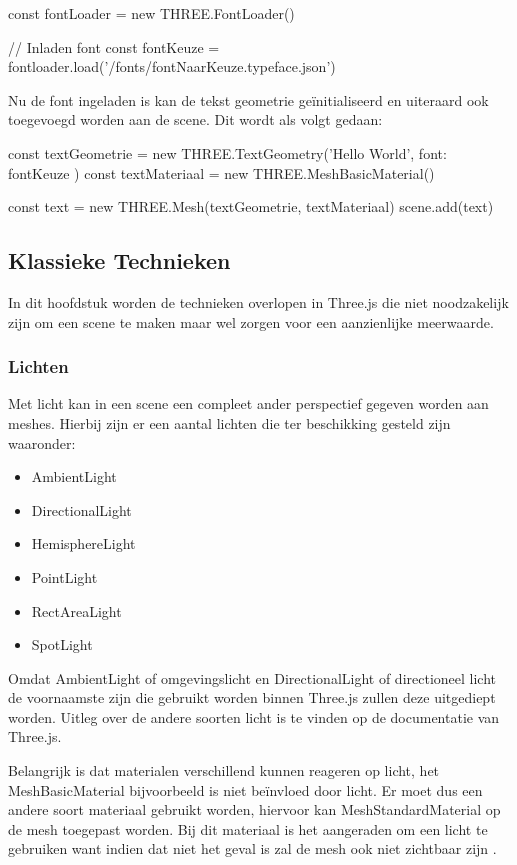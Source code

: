 \begin{LVerbatim}
const fontLoader = new THREE.FontLoader()

// Inladen font
const fontKeuze = fontloader.load('/fonts/fontNaarKeuze.typeface.json')
\end{LVerbatim}

Nu de font ingeladen is kan de tekst geometrie geïnitialiseerd en uiteraard ook toegevoegd worden aan de scene. Dit wordt als volgt gedaan:

\begin{LVerbatim}
const textGeometrie = new THREE.TextGeometry('Hello World', { font: fontKeuze })
const textMateriaal = new THREE.MeshBasicMaterial()

const text = new THREE.Mesh(textGeometrie, textMateriaal)
scene.add(text)
\end{LVerbatim}

\subsection{Klassieke Technieken}

In dit hoofdstuk worden de technieken overlopen in Three.js die niet noodzakelijk zijn om een scene te maken maar wel zorgen voor een aanzienlijke meerwaarde.

\subsubsection{Lichten}

Met licht kan in een scene een compleet ander perspectief gegeven worden aan meshes. Hierbij zijn er een aantal lichten die ter beschikking gesteld zijn waaronder:

\begin{itemize}
	\item AmbientLight
	\item DirectionalLight
	\item HemisphereLight
	\item PointLight
	\item RectAreaLight
	\item SpotLight
\end{itemize}

Omdat AmbientLight of omgevingslicht en DirectionalLight of directioneel licht de voornaamste zijn die gebruikt worden binnen Three.js zullen deze uitgediept worden. Uitleg over de andere soorten licht is te vinden op de documentatie van Three.js.

Belangrijk is dat materialen verschillend kunnen reageren op licht, het MeshBasicMaterial bijvoorbeeld is niet beïnvloed door licht. Er moet dus een andere soort materiaal gebruikt worden, hiervoor kan MeshStandardMaterial op de mesh toegepast worden. Bij dit materiaal is het aangeraden om een licht te gebruiken want indien dat niet het geval is zal de mesh ook niet zichtbaar zijn \autocite{Simon2023}.

